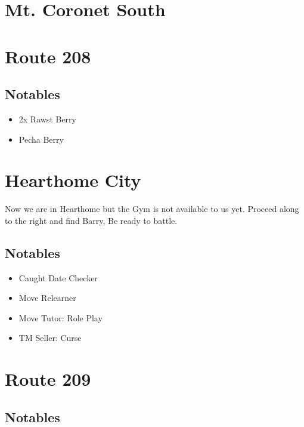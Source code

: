 \documentclass[11pt]{article}
\begin{document}
\section{Mt. Coronet South}\label{sec:mt.-coronet-south}


\section{Route 208}\label{sec:Route_208}

\subsection{Notables}\label{subsec:notables-route-208}

\begin{itemize}
    \item 2x Rawst Berry
    \item Pecha Berry
\end{itemize}




\section{Hearthome City}
Now we are in Hearthome but the Gym is not available to us yet.
Proceed along to the right and find Barry, Be ready to battle.

\subsection{Notables}\label{subsec:notables-hearthome}

\begin{itemize}
    \item Caught Date Checker
    \item Move Relearner
    \item Move Tutor: Role Play
    \item TM Seller: Curse
\end{itemize}

\section{Route 209}\label{sec:Route_209}

\subsection{Notables}\label{subsec:notables-route-209}
\end{document}
